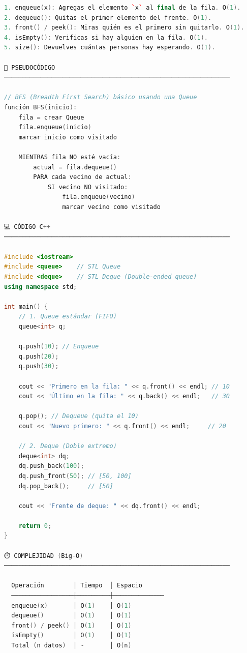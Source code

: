 \documentclass{article}
\begin{document}
\begin{lstlisting}[language=C++]
1. enqueue(x): Agregas el elemento `x` al final de la fila. O(1).
2. dequeue(): Quitas el primer elemento del frente. O(1).
3. front() / peek(): Miras quién es el primero sin quitarlo. O(1).
4. isEmpty(): Verificas si hay alguien en la fila. O(1).
5. size(): Devuelves cuántas personas hay esperando. O(1).

📝 PSEUDOCÓDIGO
──────────────────────────────────────────────────────────────

// BFS (Breadth First Search) básico usando una Queue
función BFS(inicio):
    fila = crear Queue
    fila.enqueue(inicio)
    marcar inicio como visitado

    MIENTRAS fila NO esté vacía:
        actual = fila.dequeue()
        PARA cada vecino de actual:
            SI vecino NO visitado:
                fila.enqueue(vecino)
                marcar vecino como visitado

💻 CÓDIGO C++
──────────────────────────────────────────────────────────────

#include <iostream>
#include <queue>    // STL Queue
#include <deque>    // STL Deque (Double-ended queue)
using namespace std;

int main() {
    // 1. Queue estándar (FIFO)
    queue<int> q;
    
    q.push(10); // Enqueue
    q.push(20);
    q.push(30);

    cout << "Primero en la fila: " << q.front() << endl; // 10
    cout << "Último en la fila: " << q.back() << endl;   // 30

    q.pop(); // Dequeue (quita el 10)
    cout << "Nuevo primero: " << q.front() << endl;     // 20

    // 2. Deque (Doble extremo)
    deque<int> dq;
    dq.push_back(100);
    dq.push_front(50); // [50, 100]
    dq.pop_back();     // [50]
    
    cout << "Frente de deque: " << dq.front() << endl;

    return 0;
}

⏱️ COMPLEJIDAD (Big-O)
──────────────────────────────────────────────────────────────

  Operación        │ Tiempo  │ Espacio
  ─────────────────┼─────────┼──────────────
  enqueue(x)       │ O(1)    │ O(1)
  dequeue()        │ O(1)    │ O(1)
  front() / peek() │ O(1)    │ O(1)
  isEmpty()        │ O(1)    │ O(1)
  Total (n datos)  │ -       │ O(n)
\end{lstlisting}
\end{document}
